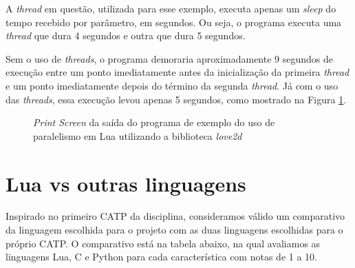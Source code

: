 \documentclass[rel_mlp]{iiufrgs}
\begin{document}
A \textit{thread} em questão, utilizada para esse exemplo, executa apenas um \textit{sleep} do tempo recebido por parâmetro, em segundos. Ou seja, o programa executa uma \textit{thread} que dura 4 segundos e outra que dura 5 segundos.

Sem o uso de \textit{threads}, o programa demoraria aproximadamente 9 segundos de execução entre um ponto imediatamente antes da inicialização da primeira \textit{thread} e um ponto imediatamente depois do término da segunda \textit{thread}. Já com o uso das \textit{threads}, essa execução levou apenas 5 segundos, como mostrado na Figura \ref{fig:Figura2}.

\begin{figure}[H]
     \centering
     \caption{\textit{Print Screen} da saída do programa de exemplo do uso de paralelismo em Lua utilizando a biblioteca \textit{love2d}}
     \label{fig:Figura2}
\end{figure}

\chapter{Lua vs outras linguagens}

Inspirado no primeiro CATP da disciplina, consideramos válido um comparativo da linguagem escolhida para o projeto com as duas linguagens escolhidas para o próprio CATP. O comparativo está na tabela abaixo, na qual avaliamos as linguagens Lua, C e Python para cada característica com notas de 1 a 10.
\\ \\
\end{document}
